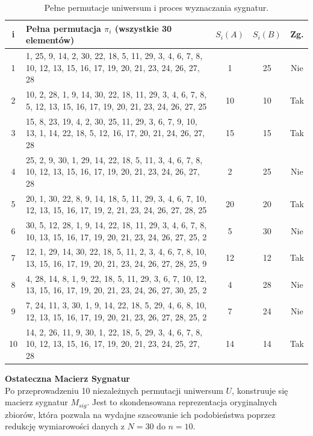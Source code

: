 \documentclass[12pt,a4paper]{article}
\begin{document}
\begin{table}[h!]
\centering
\caption{Pełne permutacje uniwersum i proces wyznaczania sygnatur.}
\label{tab:permutations_full}
\scriptsize
\begin{tabular}{|c|p{10cm}|c|c|c|}
\hline
\textbf{i} & \textbf{Pełna permutacja $\pi_i$ (wszystkie 30 elementów)} & $S_i(A)$ & $S_i(B)$ & \textbf{Zg.} \\ \hline
1 & 1, 25, 9, 14, 2, 30, 22, 18, 5, 11, 29, 3, 4, 6, 7, 8, 10, 12, 13, 15, 16, 17, 19, 20, 21, 23, 24, 26, 27, 28 & 1 & 25 & Nie \\ \hline
2 & 10, 2, 28, 1, 9, 14, 30, 22, 18, 11, 29, 3, 4, 6, 7, 8, 5, 12, 13, 15, 16, 17, 19, 20, 21, 23, 24, 26, 27, 25 & 10 & 10 & Tak \\ \hline
3 & 15, 8, 23, 19, 4, 2, 30, 25, 11, 29, 3, 6, 7, 9, 10, 13, 1, 14, 22, 18, 5, 12, 16, 17, 20, 21, 24, 26, 27, 28 & 15 & 15 & Tak \\ \hline
4 & 25, 2, 9, 30, 1, 29, 14, 22, 18, 5, 11, 3, 4, 6, 7, 8, 10, 12, 13, 15, 16, 17, 19, 20, 21, 23, 24, 26, 27, 28 & 2 & 25 & Nie \\ \hline
5 & 20, 1, 30, 22, 8, 9, 14, 18, 5, 11, 29, 3, 4, 6, 7, 10, 12, 13, 15, 16, 17, 19, 2, 21, 23, 24, 26, 27, 28, 25 & 20 & 20 & Tak \\ \hline
6 & 30, 5, 12, 28, 1, 9, 14, 22, 18, 11, 29, 3, 4, 6, 7, 8, 10, 13, 15, 16, 17, 19, 20, 21, 23, 24, 26, 27, 25, 2 & 5 & 30 & Nie \\ \hline
7 & 12, 1, 29, 14, 30, 22, 18, 5, 11, 2, 3, 4, 6, 7, 8, 10, 13, 15, 16, 17, 19, 20, 21, 23, 24, 26, 27, 28, 25, 9 & 12 & 12 & Tak \\ \hline
8 & 4, 28, 14, 8, 1, 9, 22, 18, 5, 11, 29, 3, 6, 7, 10, 12, 13, 15, 16, 17, 19, 20, 21, 23, 24, 26, 27, 30, 25, 2 & 4 & 28 & Nie \\ \hline
9 & 7, 24, 11, 3, 30, 1, 9, 14, 22, 18, 5, 29, 4, 6, 8, 10, 12, 13, 15, 16, 17, 19, 20, 21, 23, 26, 27, 28, 25, 2 & 7 & 24 & Nie \\ \hline
10 & 14, 2, 26, 11, 9, 30, 1, 22, 18, 5, 29, 3, 4, 6, 7, 8, 10, 12, 13, 15, 16, 17, 19, 20, 21, 23, 24, 25, 27, 28 & 14 & 14 & Tak \\ \hline
\end{tabular}
\end{table}

\newpage

\textbf{Ostateczna Macierz Sygnatur} \\
Po przeprowadzeniu 10 niezależnych permutacji uniwersum $U$, konstruuje się macierz sygnatur $M_{sig}$. Jest to skondensowana reprezentacja oryginalnych zbiorów, która pozwala na wydajne szacowanie ich podobieństwa poprzez redukcję wymiarowości danych z $N=30$ do $n=10$.
\end{document}
